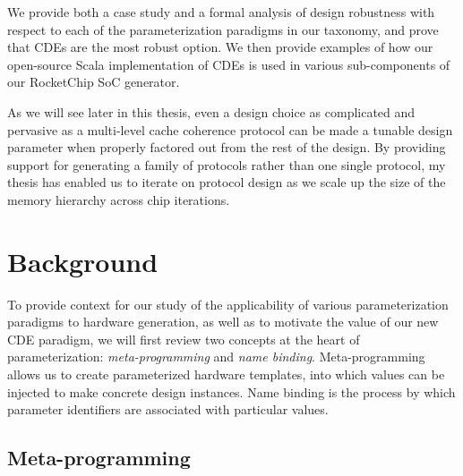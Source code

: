 We provide both a case study and a formal analysis of design robustness with respect to each of the parameterization paradigms in our taxonomy, and prove that CDEs are the most robust option.
We then provide examples of how our open-source Scala implementation of CDEs is used in various sub-components of our RocketChip SoC generator.

As we will see later in this thesis, even a design choice as complicated and pervasive as a multi-level cache coherence protocol can be made a tunable design parameter when properly factored out from the rest of the design. 
By providing support for generating a family of protocols rather than one single protocol, my thesis has enabled us to iterate on protocol design as we scale up the size of the memory hierarchy across chip iterations.

\section{Background}
\label{sec:rel}


To provide context for our study of the applicability of various parameterization paradigms to hardware generation,
as well as to motivate the value of our new CDE paradigm,
we will first review two concepts at the heart of parameterization:
\emph{meta-programming} and \emph{name binding}.
Meta-programming allows us to create parameterized hardware templates, into which values can be injected to make concrete design instances.
Name binding is the process by which parameter identifiers are associated with particular values.

\subsection{Meta-programming}


